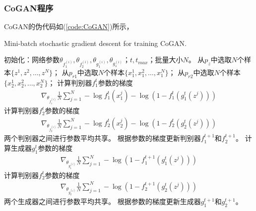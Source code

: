         \subsubsection{CoGAN程序}
            \par
            CoGAN的伪代码如(\ref{code:CoGAN})所示，
            \begin{algorithm}[htbp]
                \caption{Mini-batch stochastic gradient descent for training CoGAN.}\label{code:CoGAN}
                \begin{algorithmic}[1]
                    \State 初始化：网络参数$\theta_{f_1^{(i)}},\theta_{f_2^{(i)}},\theta_{g_1^{(i)}},\theta_{g_s^{(i)}}$；$t,t_{max}$；批量大小$N$。
                        \State 从$p_z$中选取$N$个样本$\{z^1,z^2,\dots,z^N\}$；
                        \State 从$p_{r1}$中选取$N$个样本$\{x_1^1,x_1^2,\dots,x_1^N\}$；
                        \State 从$p_{r2}$中选取$N$个样本$\{x_2^1,x_2^2,\dots,x_2^N\}$；
                        \State 计算判别器$f_1^t$参数的梯度
                        \begin{align*}
                        \nabla_{\theta_{f_1^{(i)}}} \frac{1}{N}\sum_{j=1}^N - \log f_1^t(x_1^j) - \log (1-f_1^t(g_1^t(z^j)))
                        \end{align*}
                        \State 计算判别器$f_2^t$参数的梯度
                        \begin{align*}
                        \nabla_{\theta_{f_2^{(i)}}} \frac{1}{N}\sum_{j=1}^N - \log f_2^t(x_2^j) - \log (1-f_2^t(g_2^t(z^j)))
                        \end{align*}
                        \State 两个判别器之间进行参数平均共享。
                        \State 根据参数的梯度更新判别器$f_1^{t+1}$和$f_2^{t+1}$。
                        \State 计算生成器$g_1^t$参数的梯度
                        \begin{align*}
                        \nabla_{\theta_{g_1^{(i)}}} \frac{1}{N}\sum_{j=1}^N  - \log (1-f_1^{t+1}(g_1^t(z^j)))
                        \end{align*}
                        \State 计算判别器$f_2^t$参数的梯度
                        \begin{align*}
                        \nabla_{\theta_{g_2^{(i)}}} \frac{1}{N}\sum_{j=1}^N - \log (1-f_2^{t+1}(g_2^t(z^j)))
                        \end{align*}
                        \State 两个生成器之间进行参数平均共享。
                        \State 根据参数的梯度更新生成器$g_1^{t+1}$和$g_2^{t+1}$。
                    \EndFor
                \end{algorithmic}
            \end{algorithm}
